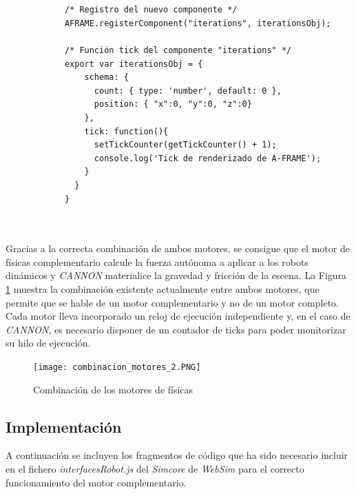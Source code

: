 \small {
\begin{verbatim}


            /* Registro del nuevo componente */
            AFRAME.registerComponent("iterations", iterationsObj);
            
            /* Función tick del componente "iterations" */
            export var iterationsObj = {
                schema: {
                  count: { type: 'number', default: 0 },
                  position: { "x":0, "y":0, "z":0}
                },
                tick: function(){
                  setTickCounter(getTickCounter() + 1);
                  console.log('Tick de renderizado de A-FRAME');
                }
              }
            }
            
            
\end{verbatim}
}

\normalsize
Gracias a la correcta combinación de ambos motores, se consigue que el motor de físicas complementario calcule la fuerza autónoma a aplicar a los robots dinámicos y \textit{CANNON} materialice la gravedad y fricción de la escena. La Figura \ref{fig:combi_motor} muestra la combinación existente actualmente entre ambos motores, que permite que se hable de un motor complementario y no de un motor completo. Cada motor lleva incorporado un reloj de ejecución independiente y, en el caso de \textit{CANNON}, es necesario disponer de un contador de ticks para poder monitorizar su hilo de ejecución.

\clearpage
\begin{figure}[h!]
    \centering
    \texttt{[image: combinacion\_motores\_2.PNG]}
    \caption[Combinación de los motores de físicas]{Combinación de los motores de físicas\footnotemark}
    \label{fig:combi_motor}
\end{figure}

\subsection{Implementación}
A continuación se incluyen los fragmentos de código que ha sido necesario incluir en el fichero \textit{interfacesRobot.js} del \textit{Simcore} de \textit{WebSim} para el correcto funcionamiento del motor complementario. \newline

